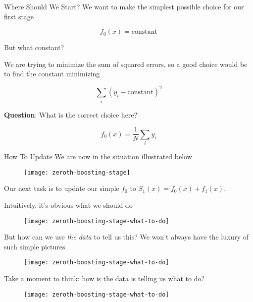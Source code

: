 \begin{frame}{Where Should We Start?}
We want to make the simplest possible choice for our first stage

$$ f_0(x) = \text{constant} $$

But what constant?
\end{frame}
%

\begin{frame}
We are trying to minimize the sum of squared errors, so a good choice would be to find the constant minimizing

$$ \sum_i \left( y_i - \text{constant} \right)^2 $$

\textbf{Question}: What is the correct choice here?
\end{frame}
%

\begin{frame}
$$ f_0(x) = \frac{1}{N} \sum_i y_i $$
\end{frame}
%

\begin{frame}{How To Update}
We are now in the situation illustrated below

  \begin{figure}
    \texttt{[image: zeroth-boosting-stage]}
  \end{figure}

Our next task is to update our simple $f_0$ to $S_1(x) = f_0(x) + f_1(x)$.

\end{frame}
%

\begin{frame}
Intuitively, it's obvious what we should do

  \begin{figure}
    \texttt{[image: zeroth-boosting-stage-what-to-do]}
  \end{figure}
\end{frame}
%

\begin{frame}
But how can we use \textit{the data} to tell us this?  We won't always have the luxury of such simple pictures.

  \begin{figure}
    \texttt{[image: zeroth-boosting-stage-what-to-do]}
  \end{figure}
  
\end{frame}
%
\begin{frame}
Take a moment to think: how is the data is telling us what to do?

  \begin{figure}
    \texttt{[image: zeroth-boosting-stage-what-to-do]}
  \end{figure}
  
\end{frame}
%

